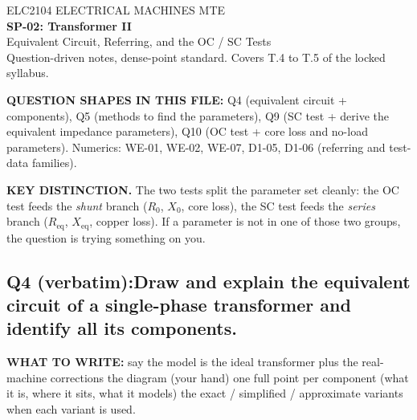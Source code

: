 \documentclass[11pt]{article}
\newcommand{\qhead}[2]{\subsection*{\color{copper}#1\quad\color{iron}#2}}
\newcommand{\tagline}[1]{\textbf{\color{copper}#1}}
\newcommand{\keydist}[1]{\vspace{2pt}\textbf{\color{red}KEY DISTINCTION.} #1}
\begin{document}
\begin{center}
{\footnotesize\color{copper} ELC2104 \textbar{} ELECTRICAL MACHINES \textbar{} MTE}\\[6pt]
{\LARGE\bfseries\color{iron} SP-02: Transformer II}\\[2pt]
{\Large\color{copper} Equivalent Circuit, Referring, and the OC / SC Tests}\\[6pt]
{\footnotesize\color{muted} Question-driven notes, dense-point standard. Covers T.4 to T.5 of the locked syllabus.}
\end{center}

\vspace{2pt}
\tagline{QUESTION SHAPES IN THIS FILE:} Q4 (equivalent circuit + components), Q5 (methods to find the parameters), Q9 (SC test + derive the equivalent impedance parameters), Q10 (OC test + core loss and no-load parameters). Numerics: WE-01, WE-02, WE-07, D1-05, D1-06 (referring and test-data families).
\vspace{2pt}

\keydist{The two tests split the parameter set cleanly: the OC test feeds the \emph{shunt} branch ($R_0$, $X_0$, core loss), the SC test feeds the \emph{series} branch ($R_{\text{eq}}$, $X_{\text{eq}}$, copper loss). If a parameter is not in one of those two groups, the question is trying something on you.}

\hrulefill

\qhead{Q4 (verbatim):}{Draw and explain the equivalent circuit of a single-phase transformer and identify all its components.}

\tagline{WHAT TO WRITE:} say the model is the ideal transformer plus the real-machine corrections \textrightarrow{} the diagram (your hand) \textrightarrow{} one full point per component (what it is, where it sits, what it models) \textrightarrow{} the exact / simplified / approximate variants \textrightarrow{} when each variant is used.
\end{document}
